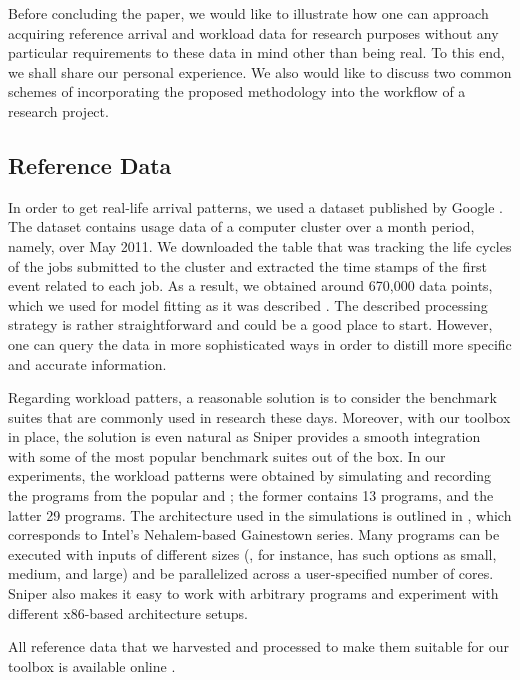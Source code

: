 Before concluding the paper, we would like to illustrate how one can approach
acquiring reference arrival and workload data for research purposes without any
particular requirements to these data in mind other than being real. To this
end, we shall share our personal experience. We also would like to discuss two
common schemes of incorporating the proposed methodology into the workflow of a
research project.

\subsection{Reference Data}

In order to get real-life arrival patterns, we used a dataset published by
Google \cite{google}. The dataset contains usage data of a computer cluster over
a month period, namely, over May 2011. We downloaded the table that was tracking
the life cycles of the jobs submitted to the cluster and extracted the time
stamps of the first event related to each job. As a result, we obtained around
670,000 data points, which we used for model fitting as it was described
. The described processing strategy is rather straightforward and
could be a good place to start. However, one can query the data in more
sophisticated ways in order to distill more specific and accurate information.

Regarding workload patters, a reasonable solution is to consider the benchmark
suites that are commonly used in research these days. Moreover, with our toolbox
in place, the solution is even natural as Sniper provides a smooth integration
with some of the most popular benchmark suites out of the box. In our
experiments, the workload patterns were obtained by simulating and recording the
programs from the popular  \cite{bienia2011} and 
\cite{cpu2006}; the former contains 13 programs, and the latter 29 programs. The
architecture used in the simulations is outlined in , which
corresponds to Intel's Nehalem-based Gainestown series. Many programs can be
executed with inputs of different sizes (, for instance, has such
options as small, medium, and large) and be parallelized across a user-specified
number of cores. Sniper also makes it easy to work with arbitrary programs and
experiment with different x86-based architecture setups.

All reference data that we harvested and processed to make them suitable for our
toolbox is available online \cite{sources}.

